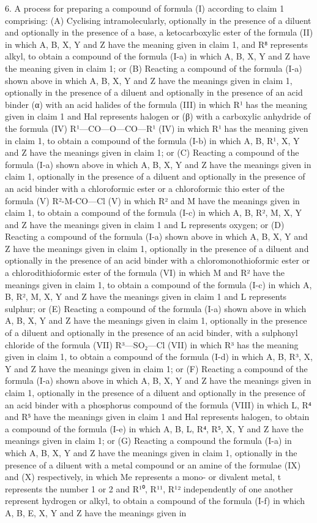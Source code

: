 \documentclass[11pt,a4paper]{article}
\begin{document}
6. A process for preparing a compound of formula (I) according to claim 1 comprising: (A) Cyclising intramolecularly, optionally in the presence of a diluent and optionally in the presence of a base, a ketocarboxylic ester of the formula (II) in which A, B, X, Y and Z have the meaning given in claim 1, and R⁸ represents alkyl, to obtain a compound of the formula (I-a) in which A, B, X, Y and Z have the meaning given in claim 1; or (B) Reacting a compound of the formula (I-a) shown above in which A, B, X, Y and Z have the meanings given in claim 1, optionally in the presence of a diluent and optionally in the presence of an acid binder (α) with an acid halides of the formula (III) in which R¹ has the meaning given in claim 1 and Hal represents halogen or (β) with a carboxylic anhydride of the formula (IV) R¹—CO—O—CO—R¹ (IV) in which R¹ has the meaning given in claim 1, to obtain a compound of the formula (I-b) in which A, B, R¹, X, Y and Z have the meanings given in claim 1; or (C) Reacting a compound of the formula (I-a) shown above in which A, B, X, Y and Z have the meanings given in claim 1, optionally in the presence of a diluent and optionally in the presence of an acid binder with a chloroformic ester or a chloroformic thio ester of the formula (V) R²-M-CO—Cl (V) in which R² and M have the meanings given in claim 1, to obtain a compound of the formula (I-c) in which A, B, R², M, X, Y and Z have the meanings given in claim 1 and L represents oxygen; or (D) Reacting a compound of the formula (I-a) shown above in which A, B, X, Y and Z have the meanings given in claim 1, optionally in the presence of a diluent and optionally in the presence of an acid binder with a chloromonothioformic ester or a chlorodithioformic ester of the formula (VI) in which M and R² have the meanings given in claim 1, to obtain a compound of the formula (I-c) in which A, B, R², M, X, Y and Z have the meanings given in claim 1 and L represents sulphur; or (E) Reacting a compound of the formula (I-a) shown above in which A, B, X, Y and Z have the meanings given in claim 1, optionally in the presence of a diluent and optionally in the presence of an acid binder, with a sulphonyl chloride of the formula (VII) R³—SO₂—Cl (VII) in which R³ has the meaning given in claim 1, to obtain a compound of the formula (I-d) in which A, B, R³, X, Y and Z have the meanings given in claim 1; or (F) Reacting a compound of the formula (I-a) shown above in which A, B, X, Y and Z have the meanings given in claim 1, optionally in the presence of a diluent and optionally in the presence of an acid binder with a phosphorus compound of the formula (VIII) in which L, R⁴ and R⁵ have the meanings given in claim 1 and Hal represents halogen, to obtain a compound of the formula (I-e) in which A, B, L, R⁴, R⁵, X, Y and Z have the meanings given in claim 1; or (G) Reacting a compound the formula (I-a) in which A, B, X, Y and Z have the meanings given in claim 1, optionally in the presence of a diluent with a metal compound or an amine of the formulae (IX) and (X) respectively, in which Me represents a mono- or divalent metal, t represents the number 1 or 2 and R¹⁰, R¹¹, R¹² independently of one another represent hydrogen or alkyl, to obtain a compound of the formula (I-f) in which A, B, E, X, Y and Z have the meanings given in 
\end{document}
